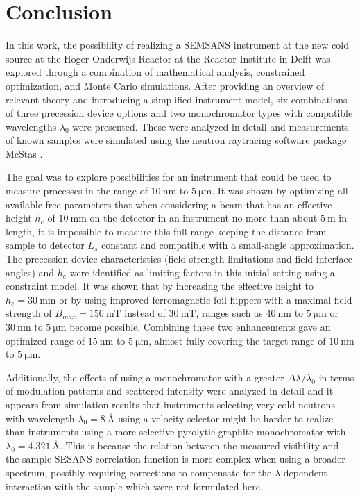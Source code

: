 \chapter{Conclusion}
\label{chapter:conclusion}
\label{c7:conclusion}
In this work, the possibility of realizing a SEMSANS instrument at the new cold source at the Hoger Onderwijs Reactor at the Reactor Institute in Delft was explored through a combination of mathematical analysis, constrained optimization, and Monte Carlo simulations. After providing an overview of relevant theory and introducing a simplified instrument model, six combinations of three precession device options and two monochromator types with compatible wavelengths $\lambda_0$ were presented. These were analyzed in detail and measurements of known samples were simulated using the neutron raytracing software package McStas \cite{willendrup2020}. 

The goal was to explore possibilities for an instrument that could be used to measure processes in the range of $\SI{10}{\nano\meter}$ to $\SI{5}{\micro\meter}$. It was shown by optimizing all available free parameters that when considering a beam that has an effective height $h_e$ of $\SI{10}{\milli\meter}$ on the detector in an instrument no more than about $\SI{5}{\meter}$ in length, it is impossible to measure this full range keeping the distance from sample to detector $L_s$ constant and compatible with a small-angle approximation. The precession device characteristics (field strength limitations and field interface angles) and  $h_e$ were identified as limiting factors in this initial setting using a constraint model. It was shown that by increasing the effective height to $h_e = \SI{30}{\milli\meter}$ or by using improved ferromagnetic foil flippers with a maximal field strength of $B_{max} = \SI{150}{\milli\tesla}$ instead of $\SI{30}{\milli\tesla}$, ranges such as $\SI{40}{\nano\meter}$ to $\SI{5}{\micro\meter}$ or $\SI{30}{\nano\meter}$ to $\SI{5}{\micro\meter}$ become possible. Combining these two enhancements gave an optimized range of $\SI{15}{\nano\meter}$ to $\SI{5}{\micro\meter}$, almost fully covering the target range of $\SI{10}{\nano\meter}$ to $\SI{5}{\micro\meter}$.

Additionally, the effects of using a monochromator with a greater $\Delta\lambda/\lambda_0$ in terms of modulation patterns and scattered intensity were analyzed in detail and it appears from simulation results that instruments selecting very cold neutrons with wavelength $\lambda_0 = \SI{8}{\angstrom}$ using a velocity selector might be harder to realize than instruments using a more selective pyrolytic graphite monochromator with $\lambda_0 = \SI{4.321}{\angstrom}$. This is because the relation between the measured visibility and the sample SESANS correlation function is more complex when using a broader spectrum, possibly requiring corrections to compensate for the $\lambda$-dependent interaction with the sample which were not formulated here.

